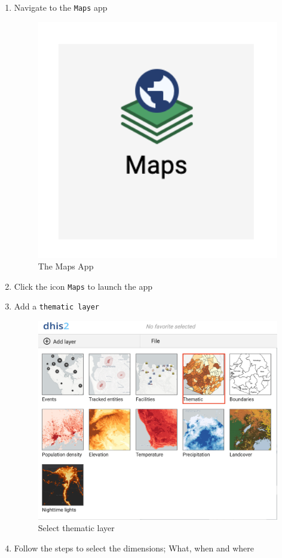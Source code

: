 \documentclass[]{book}
\begin{document}
\begin{enumerate}
\def\labelenumi{\arabic{enumi}.}
\item
  Navigate to the \texttt{Maps} app

  \begin{figure}
  \includegraphics[width=4.25in]{./images/map} \caption{The Maps App}\label{fig:map}
  \end{figure}
\item
  Click the icon \texttt{Maps} to launch the app
\item
  Add a \texttt{thematic\ layer}

  \begin{figure}
  \includegraphics[width=19.25in]{./images/maps1} \caption{Select thematic layer}\label{fig:maps1}
  \end{figure}
\item
  Follow the steps to select the dimensions; What, when and where


\end{enumerate}
\end{document}
